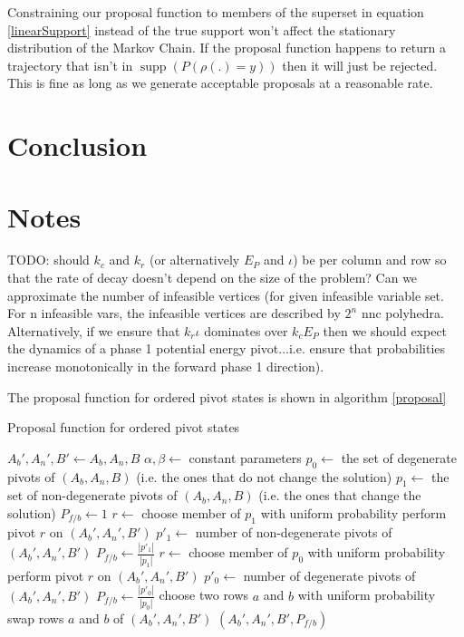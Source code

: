 \documentclass{article}
\DeclareMathOperator\supp{supp}
\begin{document}
Constraining our proposal function to members of the superset in equation \ref{linearSupport} instead of the true support won't affect the stationary distribution of the Markov Chain. If the proposal function happens to return a trajectory that isn't in $\supp(P(\rho(.)=y))$ then it will just be rejected. This is fine as long as we generate acceptable proposals at a reasonable rate.

\section{Conclusion}

\section{Notes}

TODO: should $k_c$ and $k_r$ (or alternatively $E_P$ and $\iota$) be per column and row so that the rate of decay doesn't depend on the size of the problem? Can we approximate the number of infeasible vertices (for given infeasible variable set. For n infeasible vars, the infeasible vertices are described by $2^n$ nnc polyhedra. Alternatively, if we ensure that $k_r\iota$ dominates over $k_cE_P$ then we should expect the dynamics of a phase 1 potential energy pivot...i.e. ensure that probabilities increase monotonically in the forward phase 1 direction).


The proposal function for ordered pivot states is shown in algorithm \ref{proposal}

\begin{algorithm}
	\caption{Proposal function for ordered pivot states}
	\label{proposal}
	\begin{algorithmic}
		 
		\State $A_b',A_n',B' \leftarrow A_b,A_n,B$
		\State $\alpha, \beta \leftarrow$ constant parameters
		\State $p_0 \leftarrow$ the set of degenerate pivots of $(A_b,A_n,B)$ (i.e. the ones that do not change the solution)
		\State $p_1 \leftarrow$ the set of non-degenerate pivots of $(A_b,A_n,B)$ (i.e. the ones that change the solution)
		\State $P_{f/b} \leftarrow 1$ 
		\State $r \leftarrow$ choose member of $p_1$ with uniform probability
		\State perform pivot $r$ on $(A_b',A_n',B')$
		\State $p'_1 \leftarrow $ number of non-degenerate pivots of $(A_b',A_n',B')$
		\State $P_{f/b} \leftarrow \frac{|p'_1|}{|p_1|}$
		\State $r \leftarrow$ choose member of $p_0$ with uniform probability
		\State perform pivot $r$ on $(A_b',A_n',B')$
		\State $p'_0 \leftarrow $ number of degenerate pivots of $(A_b',A_n',B')$
		\State $P_{f/b} \leftarrow \frac{|p'_0|}{|p_0|}$
		\Else
		\State choose two rows $a$ and $b$ with uniform probability
		\State swap rows $a$ and $b$ of $(A_b',A_n',B')$
		\EndIf
		\State \Return $(A_b',A_n',B',P_{f/b})$
		\EndFunction
	\end{algorithmic}
\end{algorithm}
\end{document}
